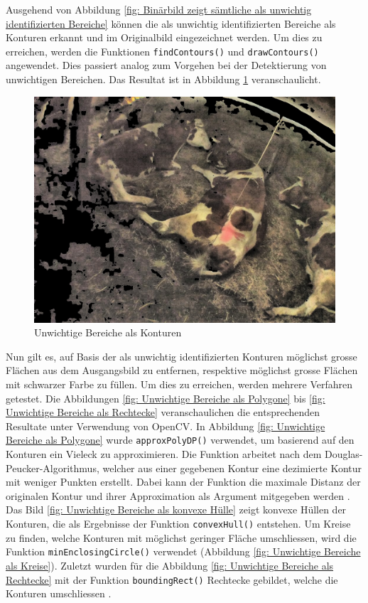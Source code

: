 Ausgehend von Abbildung \ref{fig: Binärbild zeigt sämtliche als unwichtig identifizierten Bereiche} können die als unwichtig identifizierten Bereiche als Konturen erkannt und im Originalbild eingezeichnet werden. Um dies zu erreichen, werden die Funktionen \texttt{findContours()} und \texttt{drawContours()} angewendet. Dies passiert analog zum Vorgehen bei der Detektierung von unwichtigen Bereichen. Das Resultat ist in Abbildung \ref{fig: Unwichtige Bereiche als Konturen} veranschaulicht. 
\begin{figure}[H]
	\center
	\includegraphics[scale=0.43]{Grafiken/entwicklung/6unwichtigeBereicheEingezeichnet.jpg}
	\caption{Unwichtige Bereiche  als Konturen} 
	\label{fig: Unwichtige Bereiche als Konturen}
\end{figure}

Nun gilt es, auf Basis der als unwichtig identifizierten Konturen möglichst grosse Flächen aus dem Ausgangsbild zu entfernen, respektive möglichst grosse Flächen mit schwarzer Farbe zu füllen. Um dies zu erreichen, werden mehrere Verfahren getestet. Die Abbildungen  \ref{fig: Unwichtige Bereiche als Polygone} bis \ref{fig: Unwichtige Bereiche als Rechtecke} veranschaulichen die entsprechenden Resultate unter Verwendung von OpenCV. In Abbildung \ref{fig: Unwichtige Bereiche als Polygone} wurde \texttt{approxPolyDP()} verwendet, um basierend auf den Konturen ein Vieleck zu approximieren. Die Funktion arbeitet nach dem Douglas-Peucker-Algorithmus, welcher aus einer gegebenen Kontur eine dezimierte Kontur mit weniger Punkten erstellt. Dabei kann der Funktion die maximale Distanz der originalen Kontur und ihrer Approximation als Argument mitgegeben werden \citep[S. 383]{FernandezVillan2019}.  Das Bild \ref{fig: Unwichtige Bereiche als konvexe Hülle} zeigt konvexe Hüllen der Konturen,  die als Ergebnisse der Funktion \texttt{convexHull()} entstehen. Um Kreise zu finden, welche Konturen mit möglichst geringer Fläche umschliessen, wird die Funktion \texttt{minEnclosingCircle()} verwendet (Abbildung \ref{fig: Unwichtige Bereiche als Kreise}). Zuletzt wurden für die Abbildung \ref{fig: Unwichtige Bereiche als Rechtecke} mit der Funktion \texttt{boundingRect()} Rechtecke gebildet, welche die Konturen umschliessen .

